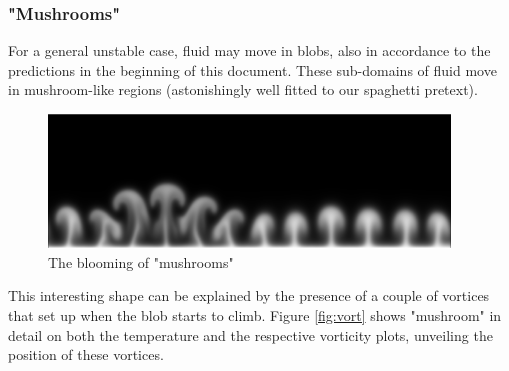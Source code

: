 \documentclass[12pt,oneside]{article}
\begin{document}
\subsubsection{"Mushrooms"}
For a general unstable case, fluid may move in blobs, also in accordance to the predictions in the beginning of this document. These sub-domains of fluid move in mushroom-like regions (astonishingly well fitted to our spaghetti pretext).

\begin{figure}[ht]
 \centering
 \includegraphics[width=0.95\textwidth]{14_0039t.png}
 \caption{The blooming of "mushrooms"}
 \label{fig:mush}
\end{figure}

This interesting shape can be explained by the presence of a couple of vortices that set up when the blob starts to climb. Figure \ref{fig:vort} shows "mushroom" in detail on both the temperature and the respective vorticity plots, unveiling the position of these vortices.
\end{document}
